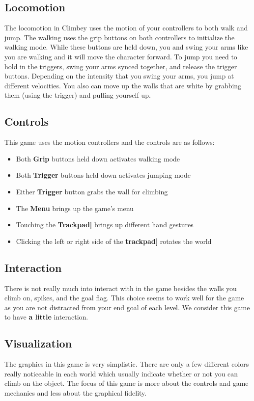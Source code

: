 \documentclass[journal]{IEEEtran}
\begin{document}
\subsection{Locomotion}
The locomotion in Climbey uses the motion of your controllers to both walk and jump. The walking uses the grip buttons on both controllers to initialize the walking mode. While these buttons are held down, you and swing your arms like you are walking and it will move the character forward. To jump you need to hold in the triggers, swing your arms synced together, and release the trigger buttons. Depending on the intensity that you swing your arms, you jump at different velocities.  You also can move up the walls that are white by grabbing them (using the trigger) and pulling yourself up.

\subsection{Controls}
This game uses the motion controllers and the controls are as follows: 

\begin{itemize}
	\item Both \textbf{Grip} buttons held down activates walking mode
	\item Both \textbf{Trigger} buttons held down activates jumping mode
	\item Either \textbf{Trigger} button grabs the wall for climbing
	\item The \textbf{Menu} brings up the game's menu
	\item Touching the \textbf{Trackpad]} brings up different hand gestures
	\item Clicking the left or right side of the \textbf{trackpad]} rotates the world
\end{itemize}

\subsection{Interaction}
There is not really much into interact with in the game besides the walls you climb on, spikes, and the goal flag. This choice seems to work well for the game as you are not distracted from your end goal of each level. We consider this game to have \textbf{a little} interaction. 
\subsection{Visualization}
The graphics in this game is very simplistic. There are only a few different colors really noticeable in each world which usually indicate whether or not you can climb on the object. The focus of this game is more about the controls and game mechanics and less about the graphical fidelity. 
\end{document}
